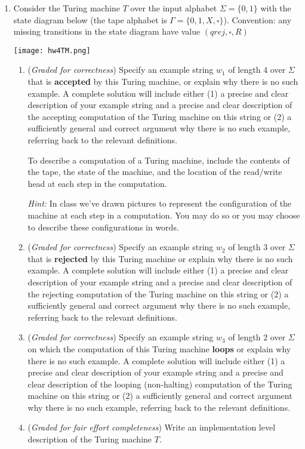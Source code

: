 \documentclass[12pt, oneside]{article}
\begin{document}
\begin{enumerate}
\item Consider the Turing machine $T$ over the input alphabet $\Sigma = \{0,1\}$ with  the state
    diagram below (the tape alphabet is $\Gamma = \{ 0,1,X,\square\}$).  
    Convention:  any missing transitions in the state diagram have value $(qrej,\square,R)$
    \begin{center}
    \texttt{[image: hw4TM.png]}
    \end{center}
    \begin{enumerate}

        \item ({\it Graded for correctness}) Specify an example string $w_1$ of length $4$ over 
        $\Sigma$ that is {\bf accepted} by this Turing machine, or explain why there is no such 
        example. A complete solution will include either (1) a precise and clear 
        description of your example  string and a precise and clear description of the accepting computation
        of the Turing machine on this string or (2) a sufficiently
        general and correct argument why there is no such example, referring back to the relevant definitions.
        
        To describe a computation of a Turing machine, include the contents of the 
        tape, the state of the machine, and the location of the read/write head at each step in the computation.
        
        {\it Hint:} In class we've drawn pictures to represent the configuration of the machine at each step 
        in a computation.  You may do so or you may choose to describe these configurations in words.
        
        \item ({\it Graded for correctness}) Specify an example string $w_2$ of length $3$ over $\Sigma$ 
        that is {\bf rejected} by this Turing machine
        or explain why there is no such 
        example. A complete solution will include either (1) a precise and clear 
        description of your example  string and a precise and clear description of the rejecting computation
        of the Turing machine on this string or (2) a sufficiently
        general and correct argument why there is no such example, referring back to the relevant definitions.

        \item ({\it Graded for correctness}) Specify an example string $w_3$ of length $2$ over $\Sigma$ 
        on which  the computation of this Turing machine {\bf loops}
        or explain why there is no such 
        example. A complete solution will include either (1) a precise and clear 
        description of your example  string and a precise and clear description of the looping (non-halting) 
        computation
        of the Turing machine on this string or (2) a sufficiently
        general and correct argument why there is no such example, referring back to the relevant definitions.

        \item ({\it Graded for fair effort completeness}) Write an implementation level description of 
        the Turing machine $T$.
\end{enumerate}

\end{enumerate}
\end{document}
